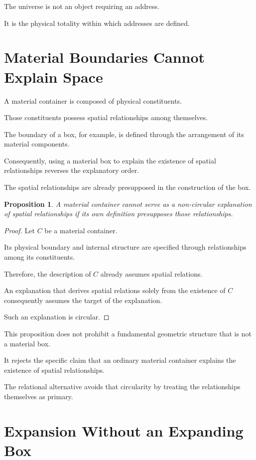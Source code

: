 \documentclass[12pt,onecolumn]{article}
\newtheorem{proposition}{Proposition}
\begin{document}
The universe is not an object
requiring an address.

It is the physical totality within
which addresses are defined.

\section{Material Boundaries Cannot Explain Space}

A material container is composed of
physical constituents.

Those constituents possess spatial
relationships among themselves.

The boundary of a box, for example,
is defined through the arrangement
of its material components.

Consequently, using a material box
to explain the existence of spatial
relationships reverses the explanatory
order.

The spatial relationships are already
presupposed in the construction of
the box.

\begin{proposition}
A material container cannot serve as
a non-circular explanation of spatial
relationships if its own definition
presupposes those relationships.
\end{proposition}

\begin{proof}
Let $C$ be a material container.

Its physical boundary and internal
structure are specified through
relationships among its constituents.

Therefore, the description of $C$
already assumes spatial relations.

An explanation that derives spatial
relations solely from the existence
of $C$ consequently assumes the
target of the explanation.

Such an explanation is circular.
\end{proof}

This proposition does not prohibit
a fundamental geometric structure
that is not a material box.

It rejects the specific claim
that an ordinary material container
explains the existence of spatial
relationships.

The relational alternative avoids
that circularity by treating the
relationships themselves as primary.

\section{Expansion Without an Expanding Box}
\end{document}
